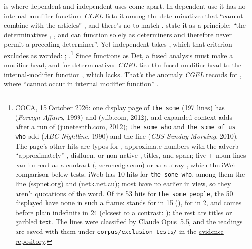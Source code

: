 \documentclass[12pt]{article}
\begin{document}
 is where dependent and independent uses come apart. In dependent use it has no internal-modifier function: \textit{CGEL} lists it among the determinatives that \enquote{cannot combine with the articles} \citep[539]{huddleston2002}, and there's no  to match . \textcite[588]{Payne2007} state it as a principle: \enquote{the determinatives , ,  and  can function solely as determiners and therefore never permit a preceding determiner}. Yet independent  takes , which that criterion excludes as worded: ; .\footnote{COCA, 15 October 2026: one display page of \texttt{the some} (197 lines) has  (\textit{Foreign Affairs}, 1999) and  (yilb.com, 2012), and expanded context adds  after a run of  (juneteenth.com, 2012); \texttt{the some who} and \texttt{the some of us who} add  (\textit{ABC Nightline}, 1990) and the  line (\textit{CBS Sunday Morning}, 2010). The page's other hits are typos for , approximate numbers with the adverb  \enquote{approximately} \citep[385]{huddleston2002}, disfluent or non-native , titles, and spam; five  + noun lines can be read as a contrast (, zerohedge.com) or as a stray , which the iWeb comparison below tests. iWeb has 10 hits for \texttt{the some who}, among them the  line (sspnet.org) and  (netk.net.au); most have no earlier  in view, so they aren't quotations of the word. Of its 53 hits for \texttt{the some people}, the 50 displayed have none in such a frame:  stands for  in 15 (), for  in 2, and comes before plain indefinite  in 24 (closest to a contrast: ); the rest are titles or garbled text. The lines were classified by Claude Opus~5.5, and the readings are saved with them under \texttt{corpus/exclusion\_tests/} in the \href{https://github.com/BrettRey/determinatives-as-nouns}{evidence repository}.} Since  functions as Det, a fused analysis must make  a modifier-head, and for determinatives \textit{CGEL} ties the fused modifier-head to the internal-modifier function \citep[410, 415]{huddleston2002}, which  lacks. That's the anomaly \textit{CGEL} records for , where  \enquote{cannot occur in internal modifier function} \citep[377]{huddleston2002}.
\end{document}
